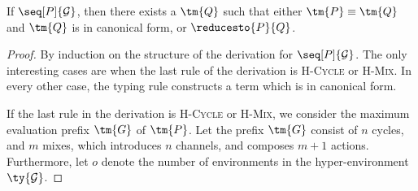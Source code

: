 \begin{theorem}[Progress]\label{thm:hccp-progress}
  If $\seq[P]{\mathcal{G}}$, then there exists a $\tm{Q}$ such that either
  $\tm{P}\equiv\tm{Q}$ and $\tm{Q}$ is in canonical form, or $\reducesto{P}{Q}$.
\end{theorem}
\begin{proof}
  By induction on the structure of the derivation for $\seq[P]{\mathcal{G}}$.
  The only interesting cases are when the last rule of the derivation is
  \textsc{H-Cycle} or \textsc{H-Mix}. In every other case, the typing rule
  constructs a term which is in canonical form. 

  If the last rule in the derivation is \textsc{H-Cycle} or \textsc{H-Mix}, we
  consider the maximum evaluation prefix $\tm{G}$ of $\tm{P}$.
  Let the prefix $\tm{G}$ consist of $n$ cycles, and $m$ mixes, which introduces
  $n$ channels, and composes $m+1$ actions.
  Furthermore, let $o$ denote the number of environments in the
  hyper-environment $\ty{\mathcal{G}}$.


\end{proof}

